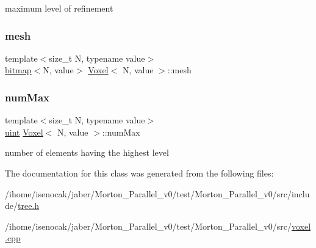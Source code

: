 maximum level of refinement \mbox{\label{classVoxel_a3d53e01604350cc00c9bef098c7e23e5}} 
\subsubsection{\texorpdfstring{mesh}{mesh}}
{\footnotesize\ttfamily template$<$size\+\_\+t N, typename value$>$ \\
\mbox{\hyperlink{definitions_8h_acf2396ef4de9eb8a6324b9f1a624ea85}{bitmap}}$<$N, value$>$ \mbox{\hyperlink{classVoxel}{Voxel}}$<$ N, value $>$\+::mesh\hspace{0.3cm}{\ttfamily [private]}}

\mbox{\label{classVoxel_addfa7b07b7173c6727fd8cf0c38c61d8}} 
\subsubsection{\texorpdfstring{num\+Max}{numMax}}
{\footnotesize\ttfamily template$<$size\+\_\+t N, typename value$>$ \\
\mbox{\hyperlink{definitions_8h_a69aa29b598b851b0640aa225a9e5d61d}{uint}} \mbox{\hyperlink{classVoxel}{Voxel}}$<$ N, value $>$\+::num\+Max\hspace{0.3cm}{\ttfamily [private]}}

number of elements having the highest level 

The documentation for this class was generated from the following files\+:\begin{DoxyCompactItemize}
\item 
/ihome/isenocak/jaber/\+Morton\+\_\+\+Parallel\+\_\+v0/test/\+Morton\+\_\+\+Parallel\+\_\+v0/src/include/\mbox{\hyperlink{tree_8h}{tree.\+h}}\item 
/ihome/isenocak/jaber/\+Morton\+\_\+\+Parallel\+\_\+v0/test/\+Morton\+\_\+\+Parallel\+\_\+v0/src/\mbox{\hyperlink{voxel_8cpp}{voxel.\+cpp}}\end{DoxyCompactItemize}
